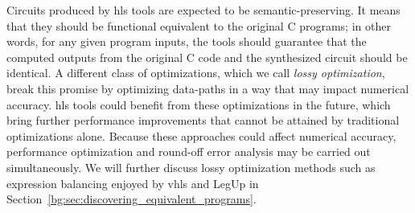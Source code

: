 Circuits produced by \gls{hls} tools are expected to be semantic-preserving.
It means that they should be functional equivalent to the original C programs;
in other words, for any given program inputs, the tools should guarantee that
the computed outputs from the original C code and the synthesized circuit
should be identical.  A different class of optimizations, which we call
\emph{lossy optimization}, break this promise by optimizing data-paths in a
way that may impact numerical accuracy.  \Gls{hls} tools could benefit from
these optimizations in the future, which bring further performance improvements
that cannot be attained by traditional optimizations alone.  Because these
approaches could affect numerical accuracy, performance optimization and
round-off error analysis may be carried out simultaneously.  We will further
discuss lossy optimization methods such as expression balancing enjoyed by
\gls{vhls} and LegUp in Section~\ref{bg:sec:discovering_equivalent_programs}.
